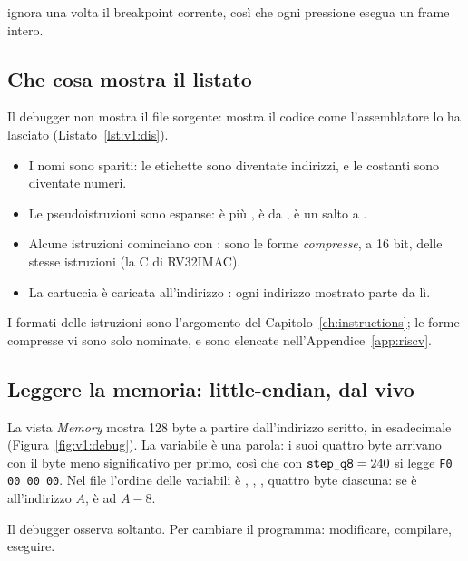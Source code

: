  ignora una volta il breakpoint corrente, così che ogni pressione
esegua un frame intero.

\subsection{Che cosa mostra il listato}

Il debugger non mostra il file sorgente: mostra il codice come l'assemblatore
lo ha lasciato (Listato~\ref{lst:v1:dis}).


\begin{itemize}
\item I nomi sono spariti: le etichette sono diventate indirizzi, e le costanti
  sono diventate numeri.
\item Le pseudoistruzioni sono espanse:  è  più
  ,  è  da ,  è un salto a
  .
\item Alcune istruzioni cominciano con : sono le forme
  \emph{compresse}, a 16 bit, delle stesse istruzioni (la C di RV32IMAC).
\item La cartuccia è caricata all'indirizzo : ogni indirizzo
  mostrato parte da lì.
\end{itemize}

I formati delle istruzioni sono l'argomento del Capitolo~\ref{ch:instructions};
le forme compresse vi sono solo nominate, e sono elencate nell'Appendice~\ref{app:riscv}.

\subsection{Leggere la memoria: little-endian, dal vivo}

La vista \emph{Memory} mostra 128 byte a partire dall'indirizzo scritto, in
esadecimale (Figura~\ref{fig:v1:debug}). La variabile  è una
parola: i suoi quattro byte arrivano con il byte meno significativo per primo,
così che con $\texttt{step\_q8}=240$ si legge \texttt{F0 00 00 00}. Nel file
l'ordine delle variabili è , , ,
quattro byte ciascuna: se  è all'indirizzo $A$,  è
ad $A-8$.

Il debugger osserva soltanto. Per cambiare il programma: modificare, compilare,
eseguire.


